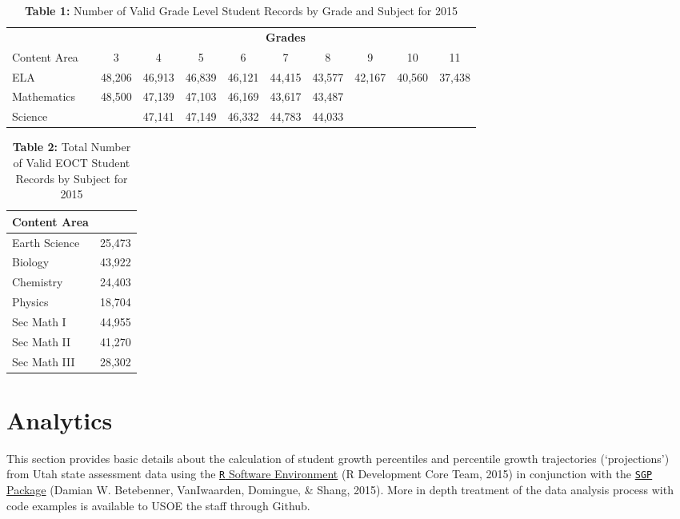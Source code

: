 \documentclass[12pt]{article}
\begin{document}
\begin{table}[H]
\caption*{\textbf{Table 1:} Number of Valid Grade Level Student Records by Grade and Subject for 2015\label{table1}} 
\begin{center}
\begin{tabular}{lclllllllll}
\hline\hline
\multicolumn{1}{c}{\bfseries }&\multicolumn{1}{c}{\bfseries }&\multicolumn{9}{c}{\bfseries Grades}\tabularnewline
\cline{1-11}
\multicolumn{1}{c}{Content Area}&\multicolumn{1}{c}{}&\multicolumn{1}{c}{3}&\multicolumn{1}{c}{4}&\multicolumn{1}{c}{5}&\multicolumn{1}{c}{6}&\multicolumn{1}{c}{7}&\multicolumn{1}{c}{8}&\multicolumn{1}{c}{9}&\multicolumn{1}{c}{10}&\multicolumn{1}{c}{11}\tabularnewline
\hline
ELA&&48,206&46,913&46,839&46,121&44,415&43,577&42,167&40,560&37,438\tabularnewline
Mathematics&&48,500&47,139&47,103&46,169&43,617&43,487&&&\tabularnewline
Science&&&47,141&47,149&46,332&44,783&44,033&&&\tabularnewline
\hline
\end{tabular}\end{center}

\end{table}

\begin{table}[H]
\caption*{\textbf{Table 2:} Total Number of Valid EOCT Student Records by Subject for 2015\label{table2}} 
\begin{center}
\begin{tabular}{ll}
\hline\hline
\multicolumn{1}{c}{Content Area}&\multicolumn{1}{c}{}\tabularnewline
\hline
Earth Science&25,473\tabularnewline
Biology&43,922\tabularnewline
Chemistry&24,403\tabularnewline
Physics&18,704\tabularnewline
Sec Math I&44,955\tabularnewline
Sec Math II&41,270\tabularnewline
Sec Math III&28,302\tabularnewline
\hline
\end{tabular}\end{center}

\end{table}

\pagebreak

\section{Analytics}\label{analytics}

This section provides basic details about the calculation of student
growth percentiles and percentile growth trajectories (`projections')
from Utah state assessment data using the
\href{http://www.r-project.org/}{\texttt{R} Software Environment} (R
Development Core Team, 2015) in conjunction with the
\href{https://github.com/CenterForAssessment/SGP}{\texttt{SGP} Package}
(Damian W. Betebenner, {VanIwaarden}, Domingue, \& Shang, 2015). More in
depth treatment of the data analysis process with code examples is
available to USOE the staff through Github.
\end{document}

